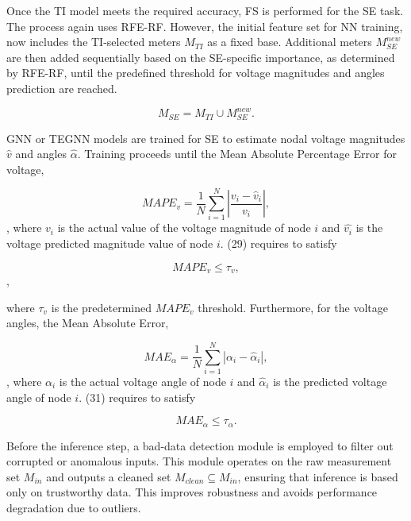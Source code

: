 \documentclass[journal]{IEEEtran}  %
\begin{document}
Once the TI model meets the required accuracy, FS is performed for the SE task. The process again uses RFE-RF. However, the initial feature set for NN training, now includes the TI-selected meters \( M_{TI} \) as a fixed base. Additional meters \( M_{SE}^{new} \) are then added sequentially based on the SE-specific importance, as determined by RFE-RF, until the predefined threshold for voltage magnitudes and angles prediction are reached.


\begin{equation}
\label{SE meter set}
M_{SE} = M_{TI} \cup M_{SE}^{new}.
\end{equation}

GNN or TEGNN models are trained for SE to estimate nodal voltage magnitudes \(\hat{v}\) and angles \(\hat{\alpha}\). Training proceeds until the Mean Absolute Percentage Error for voltage,

\begin{equation}
\label{MAPE_v}
MAPE_v = \frac{1}{N} \sum_{i=1}^N \left| \frac{v_i - \hat{v}_i}{v_i} \right|,
\end{equation}, where $v_i$ is the actual value of the voltage magnitude of node $i$ and $\hat{v_i}$ is the voltage predicted magnitude value of node $i$. (29) requires to satisfy

\begin{equation}
\label{MAPE_v tau}
MAPE_v \leq \tau_v,
\end{equation},

where $\tau_v$ is the predetermined $MAPE_v$ threshold. Furthermore, for the voltage angles, the Mean Absolute Error,

\begin{equation}
\label{MAE_a}
MAE_{\alpha} = \frac{1}{N} \sum_{i=1}^N \left| \alpha_i - \hat{\alpha}_i \right|,
\end{equation}, where $\alpha_i$ is the actual voltage angle of node $i$ and $\hat{\alpha}_i$ is the predicted voltage angle of node $i$. (31) requires to satisfy

\begin{equation}
\label{MAE_a tau}
MAE_{\alpha} \leq \tau_{\alpha}.
\end{equation}

Before the inference step, a bad-data detection module is employed to filter out corrupted or anomalous inputs. This module operates on the raw measurement set \( M_{in} \) and outputs a cleaned set \( M_{clean} \subseteq M_{in} \), ensuring that inference is based only on trustworthy data. This improves robustness and avoids performance degradation due to outliers.
\end{document}
